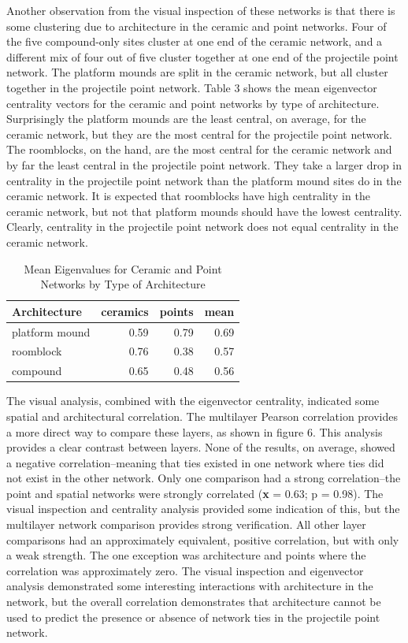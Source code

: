 \documentclass[]{interact}
\theoremstyle{plain}%
\theoremstyle{definition}
\theoremstyle{remark}
\begin{document}
Another observation from the visual inspection of these networks is that
there is some clustering due to architecture in the ceramic and point
networks. Four of the five compound-only sites cluster at one end of the
ceramic network, and a different mix of four out of five cluster
together at one end of the projectile point network. The platform mounds
are split in the ceramic network, but all cluster together in the
projectile point network. Table 3 shows the mean eigenvector centrality
vectors for the ceramic and point networks by type of architecture.
Surprisingly the platform mounds are the least central, on average, for
the ceramic network, but they are the most central for the projectile
point network. The roomblocks, on the hand, are the most central for the
ceramic network and by far the least central in the projectile point
network. They take a larger drop in centrality in the projectile point
network than the platform mound sites do in the ceramic network. It is
expected that roomblocks have high centrality in the ceramic network,
but not that platform mounds should have the lowest centrality. Clearly,
centrality in the projectile point network does not equal centrality in
the ceramic network.

\begin{table}

\caption{\label{tab:meanEigenVals}Mean Eigenvalues for Ceramic and Point Networks by Type of Architecture}
\centering
\begin{tabular}[t]{lrrr}
\toprule
Architecture & ceramics & points & mean\\
\midrule
platform mound & 0.59 & 0.79 & 0.69\\
roomblock & 0.76 & 0.38 & 0.57\\
compound & 0.65 & 0.48 & 0.56\\
\bottomrule
\end{tabular}
\end{table}

The visual analysis, combined with the eigenvector centrality, indicated
some spatial and architectural correlation. The multilayer Pearson
correlation provides a more direct way to compare these layers, as shown
in figure 6. This analysis provides a clear contrast between layers.
None of the results, on average, showed a negative correlation--meaning
that ties existed in one network where ties did not exist in the other
network. Only one comparison had a strong correlation--the point and
spatial networks were strongly correlated (\textbf{x} = 0.63; p = 0.98).
The visual inspection and centrality analysis provided some indication
of this, but the multilayer network comparison provides strong
verification. All other layer comparisons had an approximately
equivalent, positive correlation, but with only a weak strength. The one
exception was architecture and points where the correlation was
approximately zero. The visual inspection and eigenvector analysis
demonstrated some interesting interactions with architecture in the
network, but the overall correlation demonstrates that architecture
cannot be used to predict the presence or absence of network ties in the
projectile point network.
\end{document}
